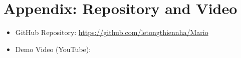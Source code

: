 
\section*{Appendix: Repository and Video}
\begin{itemize}
    \item GitHub Repository: \url{https://github.com/letongthiennha/Mario}
    \item Demo Video (YouTube): 
\end{itemize}